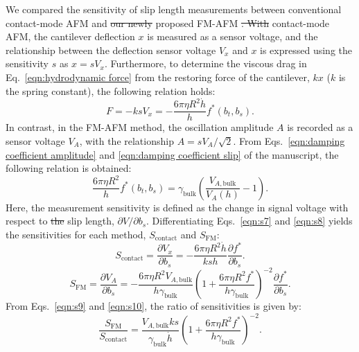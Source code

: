 \documentclass[journal=jacsat,manuscript=article]{achemso}
\providecommand{\DIFadd}[1]{{\protect\color{blue}\uwave{#1}}} %
\providecommand{\DIFdel}[1]{{\protect\color{red}\sout{#1}}} %
\providecommand{\DIFaddbegin}{} %
\providecommand{\DIFaddend}{} %
\providecommand{\DIFdelbegin}{} %
\providecommand{\DIFdelend}{} %
\newcommand{\DIFscaledelfig}{0.5}
\newlength{\DIFdelgraphicswidth} %
\newlength{\DIFdelgraphicsheight} %
\newcommand{\DIFaddincludegraphics}[2][]{{\color{blue}\fbox{\DIFOincludegraphics[#1]{#2}}}} %
\newcommand{\DIFdelincludegraphics}[2][]{%
\sbox{\DIFdelgraphicsbox}{\DIFOincludegraphics[#1]{#2}}%
\settoboxwidth{\DIFdelgraphicswidth}{\DIFdelgraphicsbox} %
\settoboxtotalheight{\DIFdelgraphicsheight}{\DIFdelgraphicsbox} %
\scalebox{\DIFscaledelfig}{%
\parbox[b]{\DIFdelgraphicswidth}{\usebox{\DIFdelgraphicsbox}\\[-\baselineskip] \rule{\DIFdelgraphicswidth}{0em}}\llap{\resizebox{\DIFdelgraphicswidth}{\DIFdelgraphicsheight}{%
\setlength{\unitlength}{\DIFdelgraphicswidth}%
\begin{picture}(1,1)%
\thicklines\linethickness{2pt} %
{\color[rgb]{1,0,0}\put(0,0){\framebox(1,1){}}}%
{\color[rgb]{1,0,0}\put(0,0){\line( 1,1){1}}}%
{\color[rgb]{1,0,0}\put(0,1){\line(1,-1){1}}}%
\end{picture}%
}\hspace*{3pt}}} %
} %
\DeclareRobustCommand{\DIFaddbegin}{\DIFOaddbegin \let\includegraphics\DIFaddincludegraphics} %
\DeclareRobustCommand{\DIFaddend}{\DIFOaddend \let\includegraphics\DIFOincludegraphics} %
\DeclareRobustCommand{\DIFdelbegin}{\DIFOdelbegin \let\includegraphics\DIFdelincludegraphics} %
\DeclareRobustCommand{\DIFdelend}{\DIFOaddend \let\includegraphics\DIFOincludegraphics} %
\begin{document}
We compared the sensitivity of slip length measurements between conventional contact-mode AFM and \DIFdelbegin \DIFdel{our newly }\DIFdelend \DIFaddbegin \DIFadd{the }\DIFaddend proposed FM-AFM \DIFdelbegin \DIFdel{. With }\DIFdelend \DIFaddbegin \DIFadd{method. In }\DIFaddend contact-mode AFM, the cantilever deflection \(x\) is measured as a sensor voltage, and the relationship between the deflection sensor voltage \(V_x\) and \(x\) is expressed using the sensitivity \(s\) as \(x = sV_x\). Furthermore, to determine the viscous drag in Eq.~\ref{eqn:hydrodynamic force} from the restoring force of the cantilever, \(kx\) (\(k\) is the spring constant), the following relation holds:
\begin{equation}
  F = -ksV_x = -\frac{6\pi\eta R^2 \dot{h}}{h} f^{*}(b_t, b_s).
  \tag{S7}
  \label{eqn:s7}
\end{equation}
In contrast, in the FM-AFM method, the oscillation amplitude \(A\) is recorded as a sensor voltage \(V_A\), with the relationship \(A = sV_A/\sqrt{2}\). From Eqs.~\ref{eqn:damping coefficient amplitude} and \ref{eqn:damping coefficient slip} of the manuscript, the following relation is obtained:
\begin{equation}
  \frac{6\pi\eta R^2}{h} f^{*}(b_t, b_s) = \gamma_{\text{bulk}}\left(\frac{V_{A,\text{bulk}}}{V_A(h)} - 1\right).
  \tag{S8}
  \label{eqn:s8}
\end{equation}
Here, the measurement sensitivity is defined as the change in signal voltage with respect to \DIFdelbegin \DIFdel{the }\DIFdelend \DIFaddbegin \DIFadd{thesubstrate }\DIFaddend slip length, \(\partial V/\partial b_s\). Differentiating Eqs.~\ref{eqn:s7} and \ref{eqn:s8} yields the sensitivities for each method, \(S_{\text{contact}}\) and \(S_{\text{FM}}\):
\begin{equation}
  S_{\text{contact}} = \frac{\partial V_x}{\partial b_s} = -\frac{6\pi\eta R^2 \dot{h}}{k s h}\frac{\partial f^{*}}{\partial b_s}.
  \tag{S9}
  \label{eqn:s9}
\end{equation}
\begin{equation}
  S_{\text{FM}} = \frac{\partial V_A}{\partial b_s} = -\frac{6\pi\eta R^2 V_{A,\text{bulk}}}{h\gamma_{\text{bulk}}}\left(1 + \frac{6\pi\eta R^2 f^{*}}{h\gamma_{\text{bulk}}}\right)^{-2}\frac{\partial f^{*}}{\partial b_s}.
  \tag{S10}
  \label{eqn:s10}
\end{equation}
From Eqs.~\ref{eqn:s9} and \ref{eqn:s10}, the ratio of sensitivities is given by:
\begin{equation}
  \frac{S_{\text{FM}}}{S_{\text{contact}}} = \frac{V_{A,\text{bulk}} k s}{\gamma_{\text{bulk}} \dot{h}}\left(1 + \frac{6\pi\eta R^2 f^{*}}{h\gamma_{\text{bulk}}}\right)^{-2}.
  \tag{S11}
  \label{eqn:s11}
\end{equation}
\end{document}
